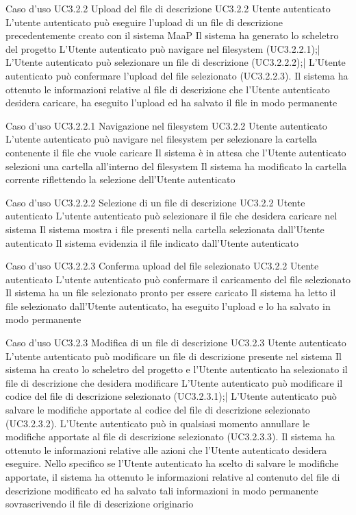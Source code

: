 \UCtitle
{Caso d'uso UC3.2.2}  
{Upload del file di descrizione}
\UC		
{UC3.2.2}		
{Utente autenticato}
{L'utente autenticato può eseguire l'upload di un file di descrizione precedentemente creato con il sistema MaaP}
{Il sistema ha generato lo scheletro del progetto}
\scenario
{L'Utente autenticato può navigare nel filesystem (UC3.2.2.1);|
L'Utente autenticato può selezionare un file di descrizione (UC3.2.2.2);|
L'Utente autenticato può confermare l'upload del file selezionato (UC3.2.2.3).
}
\post
{Il sistema ha ottenuto le informazioni relative al file di descrizione che l'Utente autenticato desidera caricare, ha eseguito l'upload ed ha salvato il file in modo permanente}

\UCtitle
{Caso d'uso UC3.2.2.1}  
{Navigazione nel filesystem}
\UC		
{UC3.2.2}		
{Utente autenticato}
{L'utente autenticato può navigare nel filesystem per selezionare la cartella contenente il file che vuole caricare}
{Il sistema è in attesa che l'Utente autenticato selezioni una cartella all'interno del filesystem}
\post
{Il sistema ha modificato la cartella corrente riflettendo la selezione dell'Utente autenticato}

\UCtitle
{Caso d'uso UC3.2.2.2}  
{Selezione di un file di descrizione}	
\UC	
{UC3.2.2}		
{Utente autenticato}
{L'utente autenticato può selezionare il file che desidera caricare nel sistema}
{Il sistema mostra i file presenti nella cartella selezionata dall'Utente autenticato}
\post
{Il sistema evidenzia il file indicato dall'Utente autenticato}

\UCtitle
{Caso d'uso UC3.2.2.3}  
{Conferma upload del file selezionato}	
\UC	
{UC3.2.2}		
{Utente autenticato}
{L'utente autenticato può confermare il caricamento del file selezionato}
{Il sistema ha un file selezionato pronto per essere caricato}
\post
{Il sistema ha letto il file selezionato dall'Utente autenticato, ha eseguito l'upload e lo ha salvato in modo permanente}

\UCtitle
{Caso d'uso UC3.2.3}  
{Modifica di un file di descrizione}
\UC		
{UC3.2.3}		
{Utente autenticato}
{L'utente autenticato può modificare un file di descrizione presente nel sistema}
{Il sistema ha creato lo scheletro del progetto e l'Utente autenticato ha selezionato il file di descrizione che desidera modificare}
\scenario
{L'Utente autenticato può modificare il codice del file di descrizione selezionato (UC3.2.3.1);|
L'Utente autenticato può salvare le modifiche apportate al codice del file di descrizione selezionato (UC3.2.3.2).
}
\estensioni
{L'Utente autenticato può in qualsiasi momento annullare le modifiche apportate al file di descrizione selezionato (UC3.2.3.3).}
\post
{Il sistema ha ottenuto le informazioni relative alle azioni che l'Utente autenticato desidera eseguire. Nello specifico se l'Utente autenticato ha scelto di salvare le modifiche apportate, il sistema ha ottenuto le informazioni relative al contenuto del file di descrizione modificato ed ha salvato tali informazioni in modo permanente sovrascrivendo il file di descrizione originario}

